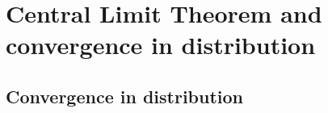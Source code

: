 

\section{Central Limit Theorem and convergence in distribution}

\subsection{Convergence in distribution}

